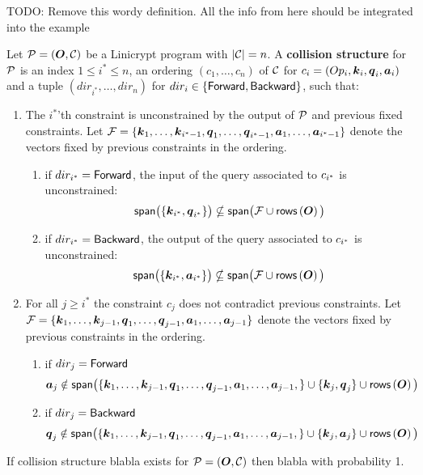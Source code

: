 TODO: Remove this wordy definition.
All the info from here should be integrated into the example

\begin{defn}
Let $\P = (\O, \C)$ be a Linicrypt program with $|\C| = n$.
A \textbf{collision structure} for $\P$ is an index $1 \leq i^* \leq n$, an ordering $(c_1, \dots, c_n)$ of $\C$ for $c_i = (Op_i, \v k_i, \v q_i,\v a_i)$
and a tuple $(dir_{i^*}, \dots, dir_n)$ for $dir_i \in \{\For, \Back\}$,
such that:
\begin{enumerate}
\item The $i^*$'th constraint is unconstrained by the output of $\P$ and previous fixed constraints.
Let $\mathcal{F} = \{
    \v k_1, \dots, \v k_{i^* -1},
    \v q_1, \dots, \v q_{i^* -1},
    \v a_1, \dots, \v a_{i^* -1}
    \}$
denote the vectors fixed by previous constraints in the ordering.
\begin{enumerate}
    \item if $dir_\is = \For$, the input of the query associated to $c_\is$ is unconstrained:
        \[
            \spn\big(\{ \v k_{i^*}, \v q_{i^*} \}\big) \nsubseteq
            \spn\big( \mathcal{F} \cup \rows\left(\O\right) \big)
        \]
    \item if $dir_\is = \Back$, the output of the query associated to $c_\is$ is unconstrained:
        \[
            \spn\big(\{ \v k_{i^*}, \v a_{i^*} \}\big) \nsubseteq
            \spn\big( \mathcal{F} \cup \rows\left(\O\right) \big)
        \]
\end{enumerate}
\item For all $j \geq i^*$ the constraint $c_j$ does not contradict previous constraints.
Let $\mathcal{F} = \{
    \v k_1, \dots, \v k_{j -1},
    \v q_1, \dots, \v q_{j -1},
    \v a_1, \dots, \v a_{j -1}
    \}$
denote the vectors fixed by previous constraints in the ordering.
\begin{enumerate}
    \item if $dir_j = \For$
        \[
        \v a_j \notin \spn\big( \{
        \v k_1, \dots, \v k_{j -1},
        \v q_1, \dots, \v q_{j -1},
        \v a_1, \dots, \v a_{j -1},
        \} 
        \cup \{ \v k_j, \v q_j\}
        \cup \rows\left(\O\right)
        \big)
        \]
    \item if $dir_j = \Back$
        \[
        \v q_j \notin \spn\big( \{
        \v k_1, \dots, \v k_{j -1},
        \v q_1, \dots, \v q_{j -1},
        \v a_1, \dots, \v a_{j -1},
        \} 
        \cup \{ \v k_j, \v a_j\}
        \cup \rows\left(\O\right)
        \big)
        \]
\end{enumerate}
\end{enumerate}
\end{defn}

\begin{lemma}
    If collision structure blabla exists for $\P = (\O, \C)$ then blabla with probability 1.
\end{lemma}

